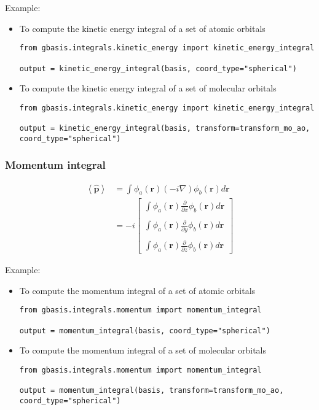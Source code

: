 \documentclass[letterpaper]{article}
\begin{document}
Example:
\begin{itemize}
\item To compute the kinetic energy integral of a set of atomic orbitals
  \begin{lstlisting}[xleftmargin=-25pt]
from gbasis.integrals.kinetic_energy import kinetic_energy_integral

output = kinetic_energy_integral(basis, coord_type="spherical")
\end{lstlisting}
\item To compute the kinetic energy integral of a set of molecular orbitals
  \begin{lstlisting}[xleftmargin=-25pt]
from gbasis.integrals.kinetic_energy import kinetic_energy_integral

output = kinetic_energy_integral(basis, transform=transform_mo_ao, coord_type="spherical")
\end{lstlisting}
\end{itemize}
\subsubsection{Momentum integral}
\begin{equation}
  \label{eq:momentum}
  \begin{split}
    \left< \hat{\mathbf{p}} \right>
    &= \int \phi_a(\mathbf{r}) \left( -i \nabla \right) \phi_b(\mathbf{r}) d\mathbf{r}\\
    &= -i
    \begin{bmatrix}
      \int \phi_a(\mathbf{r}) \frac{\partial}{\partial x} \phi_b(\mathbf{r}) d\mathbf{r}\\\\
      \int \phi_a(\mathbf{r}) \frac{\partial}{\partial y} \phi_b(\mathbf{r}) d\mathbf{r}\\\\
      \int \phi_a(\mathbf{r}) \frac{\partial}{\partial z} \phi_b(\mathbf{r}) d\mathbf{r}
    \end{bmatrix}
  \end{split}
\end{equation}

Example:
\begin{itemize}
\item To compute the momentum integral of a set of atomic orbitals
  \begin{lstlisting}[xleftmargin=-25pt]
from gbasis.integrals.momentum import momentum_integral

output = momentum_integral(basis, coord_type="spherical")
\end{lstlisting}
\item To compute the momentum integral of a set of molecular orbitals
  \begin{lstlisting}[xleftmargin=-25pt]
from gbasis.integrals.momentum import momentum_integral

output = momentum_integral(basis, transform=transform_mo_ao, coord_type="spherical")
\end{lstlisting}
\end{itemize}
\end{document}
